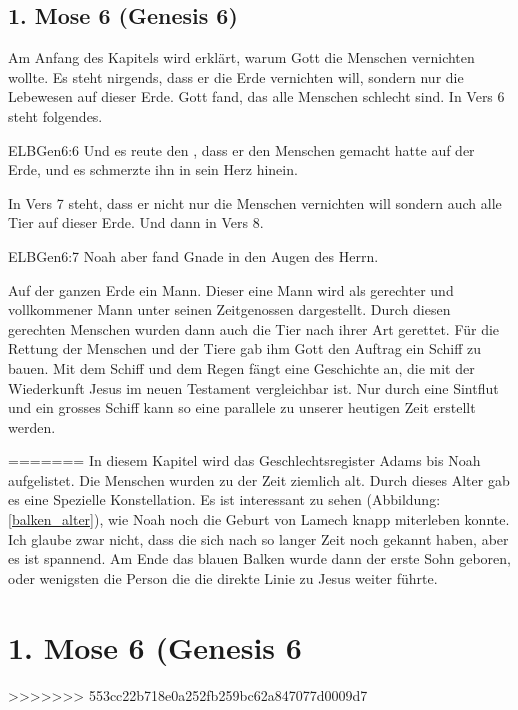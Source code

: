 \subsection{1. Mose 6 (Genesis 6)}
Am Anfang des Kapitels wird erklärt, warum Gott die Menschen vernichten wollte. Es steht nirgends, dass er die Erde vernichten will, sondern nur die Lebewesen auf dieser Erde. Gott fand, das alle Menschen schlecht sind. In Vers 6 steht folgendes.
\begin{bibeltext}{ELB}{Gen}{6:6}
	Und es reute den \herr , dass er den Menschen gemacht hatte auf der Erde, und es schmerzte ihn in sein Herz hinein.
\end{bibeltext}
In Vers 7 steht, dass er nicht nur die Menschen vernichten will sondern auch alle Tier auf dieser Erde. Und dann in Vers 8.
\begin{bibeltext}{ELB}{Gen}{6:7}
	Noah aber fand Gnade in den Augen des Herrn.
\end{bibeltext}
Auf der ganzen Erde ein Mann. Dieser eine Mann wird als gerechter und vollkommener Mann unter seinen Zeitgenossen dargestellt. Durch diesen gerechten Menschen wurden dann auch die Tier nach ihrer Art gerettet. Für die Rettung der Menschen und der Tiere gab ihm Gott den Auftrag ein Schiff zu bauen. Mit dem Schiff und dem Regen fängt eine Geschichte an, die mit der Wiederkunft Jesus im neuen Testament vergleichbar ist. Nur durch eine Sintflut und ein grosses Schiff kann so eine parallele zu unserer heutigen Zeit erstellt werden.


=======
In diesem Kapitel wird das Geschlechtsregister Adams bis Noah aufgelistet. Die Menschen wurden zu der Zeit ziemlich alt. Durch dieses Alter gab es eine Spezielle Konstellation.
Es ist interessant zu sehen (Abbildung: \ref{balken_alter}), wie Noah noch die Geburt von Lamech knapp miterleben konnte. Ich glaube zwar nicht, dass die sich nach so langer Zeit noch gekannt haben, aber es ist spannend. Am Ende das blauen Balken wurde dann der erste Sohn geboren, oder wenigsten die Person die die direkte Linie zu Jesus weiter führte. 

\section{1. Mose 6 (Genesis 6}
>>>>>>> 553cc22b718e0a252fb259bc62a847077d0009d7


